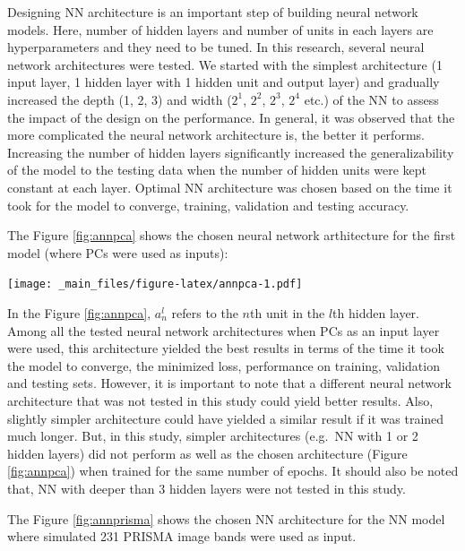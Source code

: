 \documentclass[a4paper, twoside]{templates/ociamthesis}
\let\origfigure\figure
\let\endorigfigure\endfigure
\renewenvironment{figure}[1][2] {
    \expandafter\origfigure\expandafter[H]
} {
    \endorigfigure
}
\begin{document}
Designing NN architecture is an important step of building neural network models. Here, number of hidden layers and number of units in each layers are hyperparameters and they need to be tuned. In this research, several neural network architectures were tested. We started with the simplest architecture (1 input layer, 1 hidden layer with 1 hidden unit and output layer) and gradually increased the depth (1, 2, 3) and width (\(2^{1}\), \(2^{2}\), \(2^{3}\), \(2^{4}\) etc.) of the NN to assess the impact of the design on the performance. In general, it was observed that the more complicated the neural network architecture is, the better it performs. Increasing the number of hidden layers significantly increased the generalizability of the model to the testing data when the number of hidden units were kept constant at each layer. Optimal NN architecture was chosen based on the time it took for the model to converge, training, validation and testing accuracy.

The Figure \ref{fig:annpca} shows the chosen neural network arthitecture for the first model (where PCs were used as inputs):

\begin{figure}
\centering
\texttt{[image: \_main\_files/figure-latex/annpca-1.pdf]}
\caption{\label{fig:annpca}Architecture of the Neural Network with Principal Components as inputs}
\end{figure}

In the Figure \ref{fig:annpca}, \(a_{n}^{l}\) refers to the \(n\)th unit in the \(l\)th hidden layer. Among all the tested neural network architectures when PCs as an input layer were used, this architecture yielded the best results in terms of the time it took the model to converge, the minimized loss, performance on training, validation and testing sets. However, it is important to note that a different neural network architecture that was not tested in this study could yield better results. Also, slightly simpler architecture could have yielded a similar result if it was trained much longer. But, in this study, simpler architectures (e.g.~NN with 1 or 2 hidden layers) did not perform as well as the chosen architecture (Figure \ref{fig:annpca}) when trained for the same number of epochs. It should also be noted that, NN with deeper than 3 hidden layers were not tested in this study.

The Figure \ref{fig:annprisma} shows the chosen NN architecture for the NN model where simulated 231 PRISMA image bands were used as input.
\end{document}
